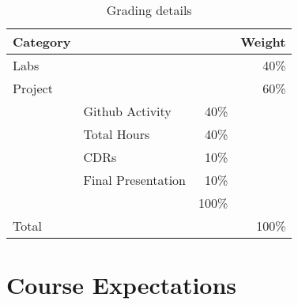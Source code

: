 \documentclass[11pt]{article}
\begin{document}
\begin{table}[htb]
  \centering
  \begin{tabular}{llrr}
    \toprule
    Category &                    &       & Weight \\
    \midrule
    Labs     &                    &       & 40\%   \\
    Project  &                    &       & 60\%   \\
             & Github Activity    & 40\%  &        \\
             & Total Hours        & 40\%  &        \\
             & CDRs               & 10\%  &        \\
             & Final Presentation & 10\%  &        \\
             &                    & 100\% &        \\
    \midrule
    Total    &                    &       & 100\%  \\
    \bottomrule
  \end{tabular}
  \caption{Grading details}
  \label{tab:grading}
\end{table}
\begin{comment}
#+ORGTBL: SEND grades orgtbl-to-latex :splice nil :skip 0 :booktabs t
| Category |                    |      | Weight |
|          |                    |  <r> |    <r> |
|----------+--------------------+------+--------|
| Labs     |                    |      |    40%
| Project  |                    |      |    60%
|          | Github Activity    |  40%
|          | Total Hours        |  40%
|          | CDRs               |  10%
|          | Final Presentation |  10%
|          |                    | 100%
|----------+--------------------+------+--------|
| Total    |                    |      |   100%
\end{comment}

\section{Course Expectations}



\printbibliography{}
\end{document}
